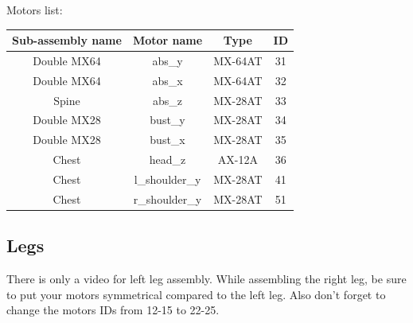 \documentclass[includefoot]{article}
\begin{document}
Motors list:

\begin{center}

\begin{tabular}{|c|c|c|c|}
\hline 
Sub-assembly name & Motor name & Type & ID \\ 
\hline 

Double MX64 & abs\_y & MX-64AT & 31 \\ 
\hline 
Double MX64 & abs\_x & MX-64AT & 32 \\
\hline 
Spine & abs\_z & MX-28AT & 33 \\
\hline 
Double MX28 & bust\_y & MX-28AT & 34 \\
\hline 
Double MX28 & bust\_x & MX-28AT & 35 \\
\hline 
Chest & head\_z & AX-12A & 36 \\ 
\hline 
Chest & l\_shoulder\_y & MX-28AT & 41 \\
\hline 
Chest & r\_shoulder\_y & MX-28AT & 51 \\
\hline 
\end{tabular} 
\end{center}

\subsection{Legs} 
 

There is only a video for left leg assembly. While assembling the right leg, be sure to put your motors symmetrical compared to the left leg. Also don't forget to change the motors IDs from 12-15 to 22-25.
\end{document}
